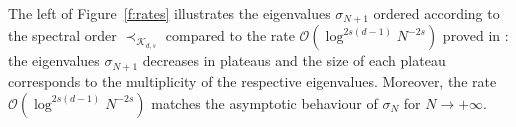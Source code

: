 \documentclass[twoside,11pt]{book}
\numberwithin{theorem}{chapter}
\numberwithin{definition}{chapter}
\numberwithin{proposition}{chapter}
\numberwithin{corollary}{chapter}
\numberwithin{example}{chapter}
\numberwithin{lemma}{chapter}
\numberwithin{assumption}{chapter}
\numberwithin{equation}{chapter}
\numberwithin{figure}{chapter}
\begin{document}
The left of Figure~\ref{f:rates} illustrates the eigenvalues $\sigma_{N+1}$ ordered according to the spectral order $\prec_{\mathcal{K}_{d,s}}$ compared to the rate $\mathcal{O}(\log^{2s(d-1)} N^{-2s})$ proved in \parencite{Bac17}: the eigenvalues $\sigma_{N+1}$ decreases in plateaus and the size of each plateau corresponds to the multiplicity of the respective eigenvalues. Moreover, the rate $\mathcal{O}(\log^{2s(d-1)} N^{-2s})$ matches the asymptotic behaviour of $\sigma_{N}$ for $N \rightarrow +\infty$.



\end{document}
